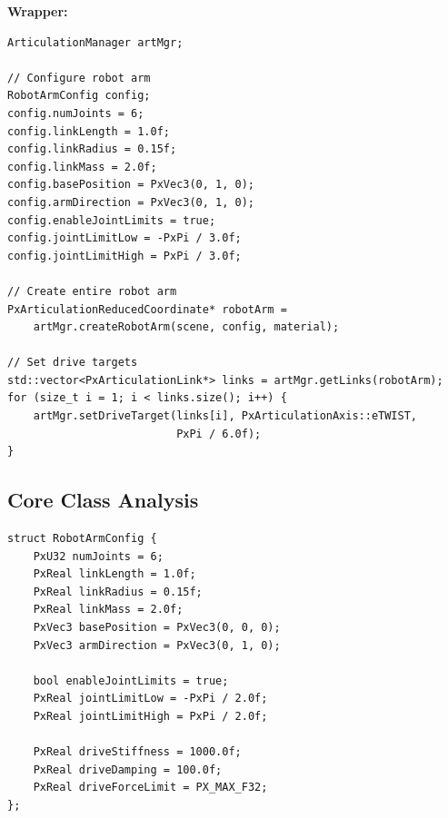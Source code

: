 \textbf{Wrapper:}
\begin{lstlisting}[caption={Config-driven articulation}]
ArticulationManager artMgr;

// Configure robot arm
RobotArmConfig config;
config.numJoints = 6;
config.linkLength = 1.0f;
config.linkRadius = 0.15f;
config.linkMass = 2.0f;
config.basePosition = PxVec3(0, 1, 0);
config.armDirection = PxVec3(0, 1, 0);
config.enableJointLimits = true;
config.jointLimitLow = -PxPi / 3.0f;
config.jointLimitHigh = PxPi / 3.0f;

// Create entire robot arm
PxArticulationReducedCoordinate* robotArm =
    artMgr.createRobotArm(scene, config, material);

// Set drive targets
std::vector<PxArticulationLink*> links = artMgr.getLinks(robotArm);
for (size_t i = 1; i < links.size(); i++) {
    artMgr.setDriveTarget(links[i], PxArticulationAxis::eTWIST,
                          PxPi / 6.0f);
}
\end{lstlisting}


\subsection{Core Class Analysis}

\begin{lstlisting}[caption={Articulation configuration}]
struct RobotArmConfig {
    PxU32 numJoints = 6;
    PxReal linkLength = 1.0f;
    PxReal linkRadius = 0.15f;
    PxReal linkMass = 2.0f;
    PxVec3 basePosition = PxVec3(0, 0, 0);
    PxVec3 armDirection = PxVec3(0, 1, 0);

    bool enableJointLimits = true;
    PxReal jointLimitLow = -PxPi / 2.0f;
    PxReal jointLimitHigh = PxPi / 2.0f;

    PxReal driveStiffness = 1000.0f;
    PxReal driveDamping = 100.0f;
    PxReal driveForceLimit = PX_MAX_F32;
};
\end{lstlisting}

